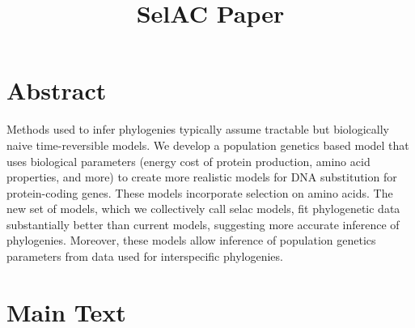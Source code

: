 \documentclass{article}
\title{SelAC Paper}
\date{}
\begin{document}
\maketitle




\section*{Abstract}
Methods used to infer phylogenies typically assume tractable but biologically naive time-reversible models.
We develop a population genetics based model that uses biological parameters (energy cost of protein production, amino acid properties, and more) to create more realistic models for DNA substitution for protein-coding genes. 
These models incorporate selection on amino acids.
The new set of models, which we collectively call selac models, fit phylogenetic data substantially better than current models, suggesting more accurate inference of phylogenies.
Moreover, these models allow inference of population genetics parameters from data used for interspecific phylogenies.

\section*{Main Text}
\end{document}
